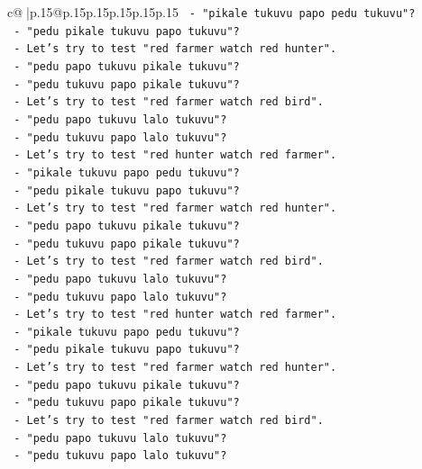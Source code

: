 \documentclass{article}
\begin{document}
{\begin{supertabular}{c@{$\;$}|p{.15\linewidth}@{}p{.15\linewidth}p{.15\linewidth}p{.15\linewidth}p{.15\linewidth}p{.15\linewidth}}
{{{\texttt{         {-} "pikale tukuvu papo pedu tukuvu"?} \\
\texttt{         {-} "pedu pikale tukuvu papo tukuvu"?} \\
\texttt{       {-} Let's try to test "red farmer watch red hunter".} \\
\texttt{         {-} "pedu papo tukuvu pikale tukuvu"?} \\
\texttt{         {-} "pedu tukuvu papo pikale tukuvu"?} \\
\texttt{       {-} Let's try to test "red farmer watch red bird".} \\
\texttt{         {-} "pedu papo tukuvu lalo tukuvu"?} \\
\texttt{         {-} "pedu tukuvu papo lalo tukuvu"?} \\
\texttt{       {-} Let's try to test "red hunter watch red farmer".} \\
\texttt{         {-} "pikale tukuvu papo pedu tukuvu"?} \\
\texttt{         {-} "pedu pikale tukuvu papo tukuvu"?} \\
\texttt{       {-} Let's try to test "red farmer watch red hunter".} \\
\texttt{         {-} "pedu papo tukuvu pikale tukuvu"?} \\
\texttt{         {-} "pedu tukuvu papo pikale tukuvu"?} \\
\texttt{       {-} Let's try to test "red farmer watch red bird".} \\
\texttt{         {-} "pedu papo tukuvu lalo tukuvu"?} \\
\texttt{         {-} "pedu tukuvu papo lalo tukuvu"?} \\
\texttt{       {-} Let's try to test "red hunter watch red farmer".} \\
\texttt{         {-} "pikale tukuvu papo pedu tukuvu"?} \\
\texttt{         {-} "pedu pikale tukuvu papo tukuvu"?} \\
\texttt{       {-} Let's try to test "red farmer watch red hunter".} \\
\texttt{         {-} "pedu papo tukuvu pikale tukuvu"?} \\
\texttt{         {-} "pedu tukuvu papo pikale tukuvu"?} \\
\texttt{       {-} Let's try to test "red farmer watch red bird".} \\
\texttt{         {-} "pedu papo tukuvu lalo tukuvu"?} \\
\texttt{         {-} "pedu tukuvu papo lalo tukuvu"?} \\
}}}
\end{supertabular}}
\end{document}
